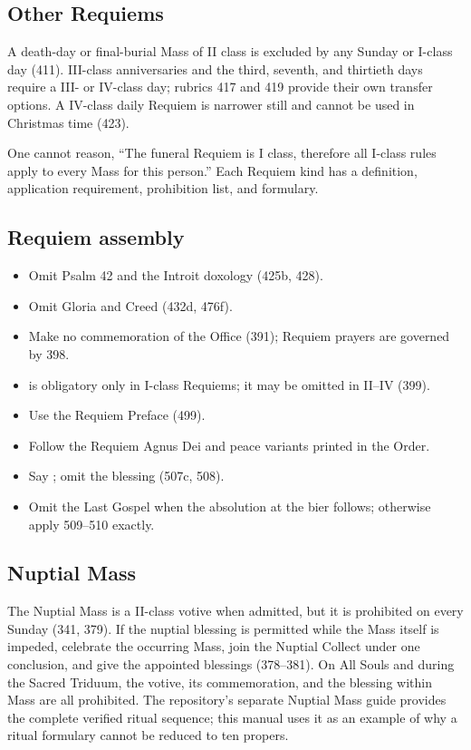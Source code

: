 \subsection{Other Requiems}

A death-day or final-burial Mass of II class is excluded by any Sunday or I-class day (411). III-class anniversaries and the third, seventh, and thirtieth days require a III- or IV-class day; rubrics 417 and 419 provide their own transfer options. A IV-class daily Requiem is narrower still and cannot be used in Christmas time (423).

One cannot reason, “The funeral Requiem is I class, therefore all I-class rules apply to every Mass for this person.” Each Requiem kind has a definition, application requirement, prohibition list, and formulary.

\subsection{Requiem assembly}

\begin{itemize}
\item Omit Psalm 42 and the Introit doxology (425b, 428).
\item Omit Gloria and Creed (432d, 476f).
\item Make no commemoration of the Office (391); Requiem prayers are governed by 398.
\item {} is obligatory only in I-class Requiems; it may be omitted in II--IV (399).
\item Use the Requiem Preface (499).
\item Follow the Requiem Agnus Dei and peace variants printed in the Order.
\item Say ; omit the blessing (507c, 508).
\item Omit the Last Gospel when the absolution at the bier follows; otherwise apply 509--510 exactly.
\end{itemize}

\subsection{Nuptial Mass}

The Nuptial Mass is a II-class votive when admitted, but it is prohibited on every Sunday (341, 379). If the nuptial blessing is permitted while the Mass itself is impeded, celebrate the occurring Mass, join the Nuptial Collect under one conclusion, and give the appointed blessings (378--381). On All Souls and during the Sacred Triduum, the votive, its commemoration, and the blessing within Mass are all prohibited. The repository's separate Nuptial Mass guide provides the complete verified ritual sequence; this manual uses it as an example of why a ritual formulary cannot be reduced to ten propers.

